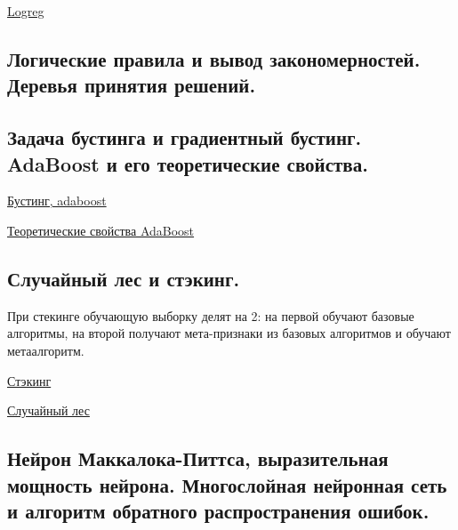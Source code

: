 \documentclass{article}
\begin{document}
\href{http://www.machinelearning.ru/wiki/index.php?title=%D0%9B%D0%BE%D0%B3%D0%B8%D1%81%D1%82%D0%B8%D1%87%D0%B5%D1%81%D0%BA%D0%B0%D1%8F_%D1%80%D0%B5%D0%B3%D1%80%D0%B5%D1%81%D1%81%D0%B8%D1%8F}{
	Logreg
}


\subsection{Логические правила и вывод закономерностей. Деревья принятия решений.}


\subsection{Задача бустинга и градиентный бустинг. AdaBoost и его теоретические свойства.}

\href{
	https://neerc.ifmo.ru/wiki/index.php?title=%
}{
	Бустинг, adaboost
}

\href{
	https://logic.pdmi.ras.ru/~sergey/teaching/mlstc12/16-boosting.pdf
}{
	Теоретические свойства AdaBoost
}


\subsection{Случайный лес и стэкинг.}


При стекинге обучающую выборку делят на 2: на первой обучают базовые алгоритмы,
на второй получают мета-признаки из базовых алгоритмов и обучают метаалгоритм.

\href{
	https://learnmachinelearning.fandom.com/ru/wiki/%
}{Стэкинг}

\href{
	https://neerc.ifmo.ru/wiki/index.php?title=%
}{Случайный лес}


\subsection{Нейрон Маккалока-Питтса, выразительная мощность нейрона. Многослойная
нейронная сеть и алгоритм обратного распространения ошибок.}
\end{document}
